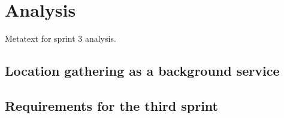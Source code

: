 \section{Analysis}
Metatext for sprint 3 analysis.

\subsection{Location gathering as a background service} \label{ssec:LocationGatherBGS}






\subsection{Requirements for the third sprint}
